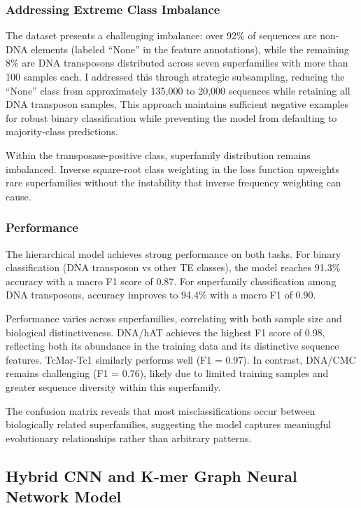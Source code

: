 \documentclass[12pt]{article}
\begin{document}
\subsubsection{Addressing Extreme Class Imbalance}

The dataset presents a challenging imbalance: over 92\% of sequences are non-DNA elements (labeled ``None'' in the feature annotations), while the remaining 8\% are DNA transposons distributed across seven superfamilies with more than 100 samples each. I addressed this through strategic subsampling, reducing the ``None'' class from approximately 135,000 to 20,000 sequences while retaining all DNA transposon samples. This approach maintains sufficient negative examples for robust binary classification while preventing the model from defaulting to majority-class predictions.

Within the transposase-positive class, superfamily distribution remains imbalanced. Inverse square-root class weighting in the loss function upweights rare superfamilies without the instability that inverse frequency weighting can cause.

\subsubsection{Performance}

The hierarchical model achieves strong performance on both tasks. For binary classification (DNA transposon vs other TE classes), the model reaches 91.3\% accuracy with a macro F1 score of 0.87. For superfamily classification among DNA transposons, accuracy improves to 94.4\% with a macro F1 of 0.90.

Performance varies across superfamilies, correlating with both sample size and biological distinctiveness. DNA/hAT achieves the highest F1 score of 0.98, reflecting both its abundance in the training data and its distinctive sequence features. TcMar-Tc1 similarly performs well (F1 = 0.97). In contrast, DNA/CMC remains challenging (F1 = 0.76), likely due to limited training samples and greater sequence diversity within this superfamily.

The confusion matrix reveals that most misclassifications occur between biologically related superfamilies, suggesting the model captures meaningful evolutionary relationships rather than arbitrary patterns.



\subsection{Hybrid CNN and K-mer Graph Neural Network Model}
\end{document}

